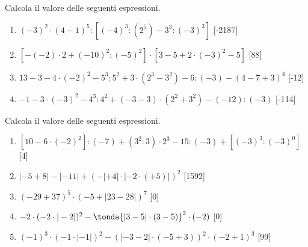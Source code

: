 \begin{esercizio} %
Calcola il valore delle seguenti espressioni.
 \begin{enumerate}[noitemsep, label=(\alph*)]
 \item \((-3)^2\cdot(4-1)^5:[(-4)^3:(2^5)-3^3:(-3)^3]\) \hfill[-2187]
 \item \([-(-2)\cdot2+(-10)^2:(-5)^2]\cdot[3-5+2\cdot(-3)^2-5]\) \hfill[88]
 \item \(13-3-4\cdot(-2)^2-5^3:5^2+3\cdot(2^3-3^2)-6:(-3)-(4-7+3)^4\)
  \hfill[-12]
 \item \(-1-3\cdot(-3)^2-4^3:4^2+(-3-3)\cdot(2^2+3^2)-(-12):(-3)\) 
\hfill[-114]
 \end{enumerate}
\end{esercizio}

\begin{esercizio} %
Calcola il valore delle seguenti espressioni.
 \begin{enumerate}[noitemsep, label=(\alph*)]
 \item \([10-6\cdot(-2)^2]:(-7)+(3^2:3)\cdot2^3-15:(-3)+[(-3)^3:(-3)^0]\)
  \hfill[4]
 \item \(|-5+8|-|-11|+(-|+4|\cdot|-2\cdot(+5)|)^2\) \hfill[1592]
 \item \((-29+37)^5\cdot(-5+|23-28|)^7\) \hfill[0]
 \item \(-2\cdot(-2\cdot|-2|)^2-\tonda{|3-5|\cdot(3-5) }^2\cdot(-2)\)
  \hfill[0]
 \item \((-1)^3\cdot(-1\cdot|-1|)^2-(|-3-2|\cdot(-5+3))^2\cdot(-2+1)^3\)
  \hfill[99]
 \end{enumerate}
\end{esercizio}
